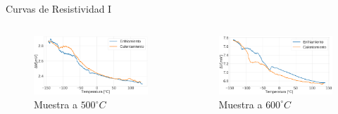 \documentclass[11pt]{beamer}
\begin{document}
			\begin{frame}[allowframebreaks]{Curvas de Resistividad I}
				\begin{columns}
					\begin{column}{.49\textwidth}
						\begin{figure}
							\includegraphics[scale=0.1]{img/Resistance_500_alt.png}
							\caption*{Muestra a $500 ^\circ C$}
						\end{figure}
					\end{column}
					\begin{column}{.49\textwidth}
						\begin{figure}
							\includegraphics[scale=0.1]{img/Resistance_600_alt.png}
							\caption*{Muestra a $600 ^\circ C$}
						\end{figure}
					\end{column}
				\end{columns}
			\end{frame}
\end{document}
